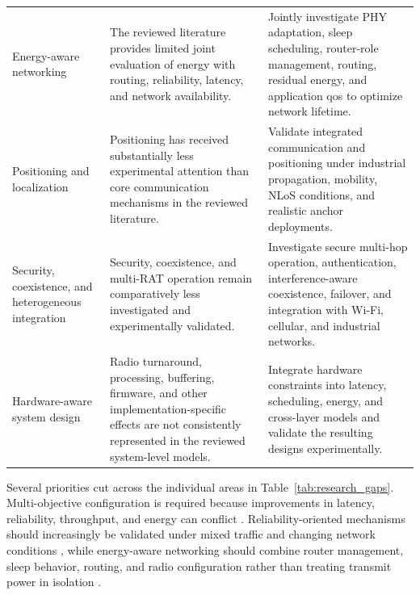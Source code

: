 \begin{table}[!t]
\begin{tabular}{p{3.0cm} p{5.3cm} p{7.0cm}}
Energy-aware networking & The reviewed literature provides limited joint evaluation of energy with routing, reliability, latency, and network availability. & Jointly investigate PHY adaptation, sleep scheduling, router-role management, routing, residual energy, and application \gls{qos} to optimize network lifetime. \\

Positioning and localization & Positioning has received substantially less experimental attention than core communication mechanisms in the reviewed literature. & Validate integrated communication and positioning under industrial propagation, mobility, NLoS conditions, and realistic anchor deployments. \\

Security, coexistence, and heterogeneous integration & Security, coexistence, and multi-RAT operation remain comparatively less investigated and experimentally validated. & Investigate secure multi-hop operation, authentication, interference-aware coexistence, failover, and integration with Wi-Fi, cellular, and industrial networks. \\

Hardware-aware system design & Radio turnaround, processing, buffering, firmware, and other implementation-specific effects are not consistently represented in the reviewed system-level models. & Integrate hardware constraints into latency, scheduling, energy, and cross-layer models and validate the resulting designs experimentally. \\

\hline
\end{tabular}
\end{table}

Several priorities cut across the individual areas in Table~\ref{tab:research_gaps}. Multi-objective configuration is required because improvements in latency, reliability, throughput, and energy can conflict \cite{grafParetoOptimalityApproach2026a}. Reliability-oriented mechanisms should increasingly be validated under mixed traffic and changing network conditions \cite{samuylovEmpoweringNearURLLCIoT2025, glazkovImprovingNearURLLCServices2025, ahmadMACLayerProtocolUltraReliable2025}, while energy-aware networking should combine router management, sleep behavior, routing, and radio configuration rather than treating transmit power in isolation \cite{nihtilaEnergyConsumptionDECT20202022, nihtilaEnergySavingRouter2022, grafParetoOptimalityApproach2026a}.

